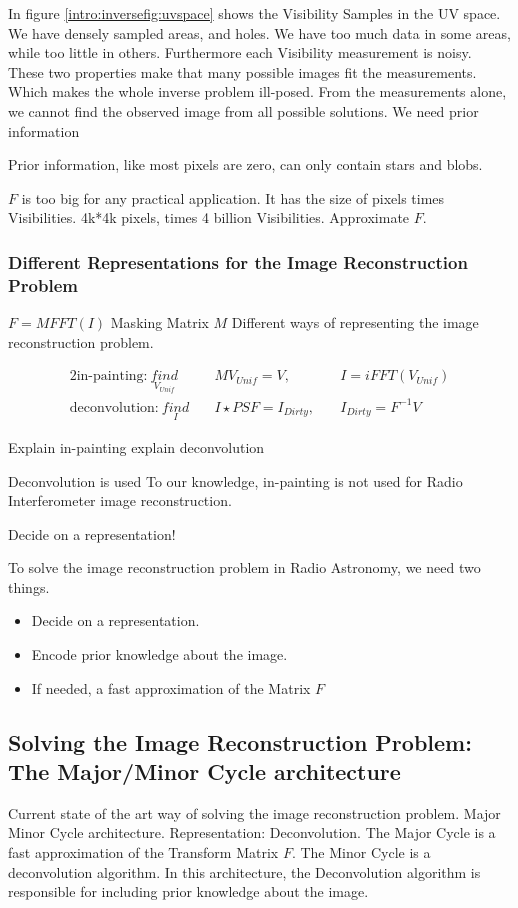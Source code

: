 In figure \ref{intro:inversefig:uvspace} shows the Visibility Samples in the UV space. We have densely sampled areas, and holes.
We have too much data in some areas, while too little in others. Furthermore each Visibility measurement is noisy. These two properties make that many possible images fit the measurements. Which makes the whole inverse problem ill-posed.
From the measurements alone, we cannot find the observed image from all possible solutions. We need prior information

Prior information, like most pixels are zero, can only contain stars and blobs.



$F$ is too big for any practical application. It has the size of pixels times Visibilities. 4k*4k pixels, times 4 billion Visibilities. Approximate $F$.

\subsubsection{Different Representations for the Image Reconstruction Problem}
$F = M FFT(I)$
Masking Matrix $M$
Different ways of representing the image reconstruction problem.

\begin{alignat}{2}
\text{in-painting:}\: \underset{V_{Unif}}{find}&\quad MV_{Unif} = V,  \quad &I = iFFT(V_{Unif})\\
\text{deconvolution:}\: \underset{I}{find}&\quad I \star PSF = I_{Dirty},  \quad &I_{Dirty} = F^{-1}V
\end{alignat}

Explain in-painting
explain deconvolution

Deconvolution is used
To our knowledge, in-painting is not used for Radio Interferometer image reconstruction.

Decide on a representation!

To solve the image reconstruction problem in Radio Astronomy, we need two things.
\begin{itemize}
	\item Decide on a representation.
	\item Encode prior knowledge about the image.
	\item If needed, a fast approximation of the Matrix $F$
\end{itemize} 


\subsection{Solving the Image Reconstruction Problem: The Major/Minor Cycle architecture}
Current state of the art way of solving the image reconstruction problem. Major Minor Cycle architecture.
Representation: Deconvolution.
The Major Cycle is a fast approximation of the Transform Matrix $F$.
The Minor Cycle is a deconvolution algorithm. In this architecture, the Deconvolution algorithm is responsible for including prior knowledge about the image.


